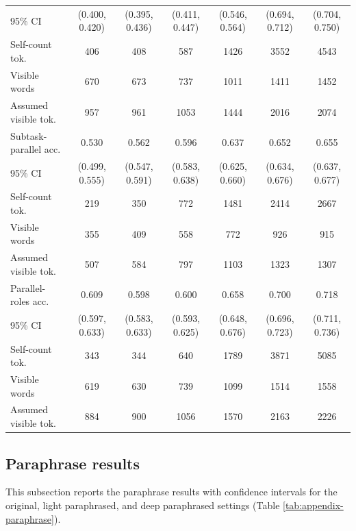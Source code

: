 \documentclass{article} %
\begin{document}
\begin{table}[t]
{\begin{tabular}{lcccccc}
95\% CI & (0.400, 0.420) & (0.395, 0.436) & (0.411, 0.447) & (0.546, 0.564) & (0.694, 0.712) & (0.704, 0.750) \\
Self-count tok. & 406 & 408 & 587 & 1426 & 3552 & 4543 \\
Visible words & 670 & 673 & 737 & 1011 & 1411 & 1452 \\
Assumed visible tok. & 957 & 961 & 1053 & 1444 & 2016 & 2074 \\
\midrule
Subtask-parallel acc. & 0.530 & 0.562 & 0.596 & 0.637 & 0.652 & 0.655 \\
95\% CI & (0.499, 0.555) & (0.547, 0.591) & (0.583, 0.638) & (0.625, 0.660) & (0.634, 0.676) & (0.637, 0.677) \\
Self-count tok. & 219 & 350 & 772 & 1481 & 2414 & 2667 \\
Visible words & 355 & 409 & 558 & 772 & 926 & 915 \\
Assumed visible tok. & 507 & 584 & 797 & 1103 & 1323 & 1307 \\
\midrule
Parallel-roles acc. & 0.609 & 0.598 & 0.600 & 0.658 & 0.700 & 0.718 \\
95\% CI & (0.597, 0.633) & (0.583, 0.633) & (0.593, 0.625) & (0.648, 0.676) & (0.696, 0.723) & (0.711, 0.736) \\
Self-count tok. & 343 & 344 & 640 & 1789 & 3871 & 5085 \\
Visible words & 619 & 630 & 739 & 1099 & 1514 & 1558 \\
Assumed visible tok. & 884 & 900 & 1056 & 1570 & 2163 & 2226 \\
\bottomrule
\end{tabular}}
\end{table}

\subsection{Paraphrase results}
This subsection reports the paraphrase results with confidence intervals for the original, light paraphrased, and deep paraphrased settings (Table \ref{tab:appendix-paraphrase}).
\end{document}
